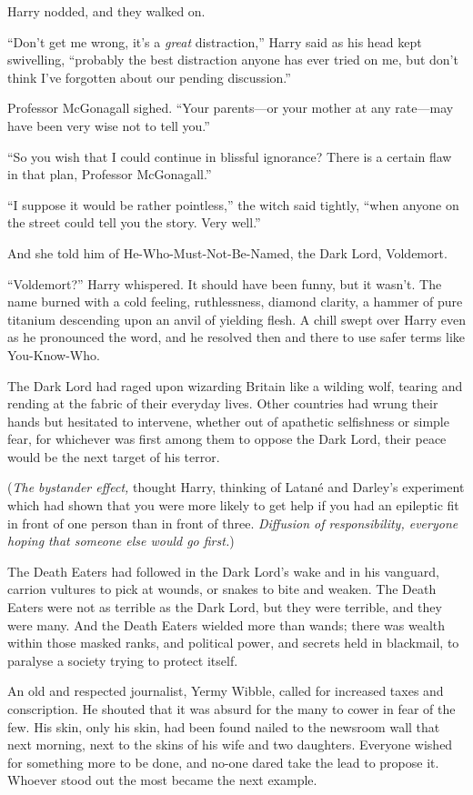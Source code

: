 Harry nodded, and they walked on.

“Don’t get me wrong, it’s a \emph{great} distraction,” Harry said as his head kept swivelling, “probably the best distraction anyone has ever tried on me, but don’t think I’ve forgotten about our pending discussion.”

Professor McGonagall sighed. “Your parents—or your mother at any rate—may have been very wise not to tell you.”

“So you wish that I could continue in blissful ignorance? There is a certain flaw in that plan, Professor McGonagall.”

“I suppose it would be rather pointless,” the witch said tightly, “when anyone on the street could tell you the story. Very well.”

And she told him of He-Who-Must-Not-Be-Named, the Dark Lord, Voldemort.

“Voldemort?” Harry whispered. It should have been funny, but it wasn’t. The name burned with a cold feeling, ruthlessness, diamond clarity, a hammer of pure titanium descending upon an anvil of yielding flesh. A chill swept over Harry even as he pronounced the word, and he resolved then and there to use safer terms like You-Know-Who.

The Dark Lord had raged upon wizarding Britain like a wilding wolf, tearing and rending at the fabric of their everyday lives. Other countries had wrung their hands but hesitated to intervene, whether out of apathetic selfishness or simple fear, for whichever was first among them to oppose the Dark Lord, their peace would be the next target of his terror.

(\emph{The bystander effect,} thought Harry, thinking of Latané and Darley’s experiment which had shown that you were more likely to get help if you had an epileptic fit in front of one person than in front of three. \emph{Diffusion of responsibility, everyone hoping that someone else would go first.})

The Death Eaters had followed in the Dark Lord’s wake and in his vanguard, carrion vultures to pick at wounds, or snakes to bite and weaken. The Death Eaters were not as terrible as the Dark Lord, but they were terrible, and they were many. And the Death Eaters wielded more than wands; there was wealth within those masked ranks, and political power, and secrets held in blackmail, to paralyse a society trying to protect itself.

An old and respected journalist, Yermy Wibble, called for increased taxes and conscription. He shouted that it was absurd for the many to cower in fear of the few. His skin, only his skin, had been found nailed to the newsroom wall that next morning, next to the skins of his wife and two daughters. Everyone wished for something more to be done, and no-one dared take the lead to propose it. Whoever stood out the most became the next example.

